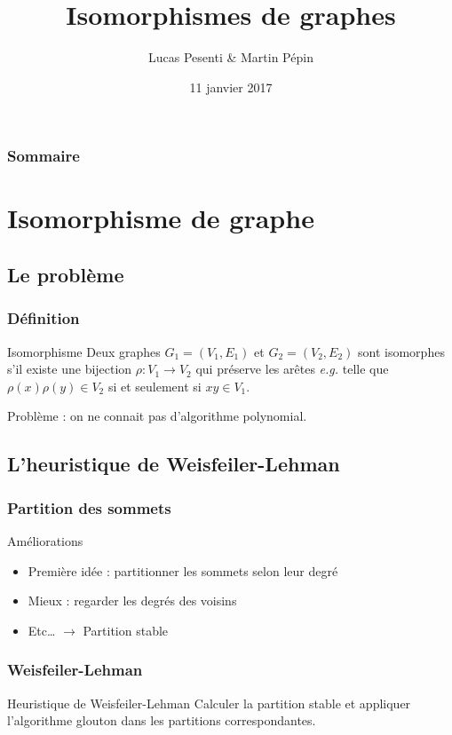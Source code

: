 \documentclass{beamer}
\title{Isomorphismes de graphes}
\author{Lucas Pesenti \& Martin Pépin}
\institute{Cours d'algorithmique}
\date{11 janvier 2017}
\begin{document}
  \begin{frame}
    \titlepage
  \end{frame}
  
  \begin{frame}
    \frametitle{Sommaire}
    \tableofcontents[hideallsubsections]
  \end{frame}

\section{Isomorphisme de graphe}
  \subsection{Le problème}

    \begin{frame}
      \frametitle{Définition}
      \begin{block}{Isomorphisme}
        Deux graphes $G_1 = (V_1, E_1)$ et $G_2 = (V_2, E_2)$ sont isomorphes
        s'il existe une bijection $\rho : V_1 \to V_2$ qui préserve les arêtes
        \emph{e.g.} telle que $\rho(x)\rho(y) \in V_2$ si et seulement si
        $xy \in V_1$.
      \end{block}
      \pause
      Problème : on ne connait pas d'algorithme polynomial.
    \end{frame}

  \subsection{L'heuristique de Weisfeiler-Lehman}

    \begin{frame}
      \frametitle{Partition des sommets}
      Améliorations
      \begin{itemize}
        \item<1-> Première idée : partitionner les sommets selon leur degré
        \item<2-> Mieux : regarder les degrés des voisins
        \item<3-> Etc… $\to$ Partition stable
      \end{itemize}
    \end{frame}

    \begin{frame}
      \frametitle{Weisfeiler-Lehman}
      \begin{block}{Heuristique de Weisfeiler-Lehman}
        Calculer la partition stable et appliquer l'algorithme glouton
        dans les partitions correspondantes.
      \end{block}
    \end{frame}
\end{document}
